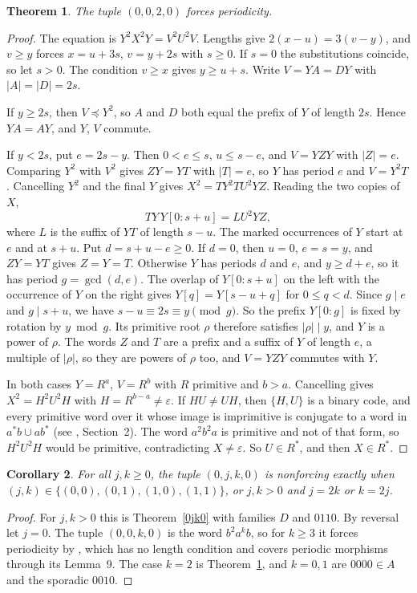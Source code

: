 \documentclass[10pt]{article}
\newtheorem{theorem}{Theorem}
\newtheorem{corollary}[theorem]{Corollary}
\newcommand{\eps}{\varepsilon}
\theoremstyle{remark}\newtheorem*{remark}{Remark}
\begin{document}
\begin{theorem}\label{0020}
The tuple \((0,0,2,0)\) forces periodicity.
\end{theorem}
\begin{proof}
The equation is \(Y^2X^2Y=V^2U^2V\). Lengths give \(2(x-u)=3(v-y)\), and \(v\ge y\) forces \(x=u+3s\), \(v=y+2s\) with \(s\ge0\). If \(s=0\) the substitutions coincide, so let \(s>0\). The condition \(v\ge x\) gives \(y\ge u+s\). Write \(V=YA=DY\) with \(|A|=|D|=2s\).

If \(y\ge2s\), then \(V\preceq Y^2\), so \(A\) and \(D\) both equal the prefix of \(Y\) of length \(2s\). Hence \(YA=AY\), and \(Y\), \(V\) commute.

If \(y<2s\), put \(e=2s-y\). Then \(0<e\le s\), \(u\le s-e\), and \(V=YZY\) with \(|Z|=e\). Comparing \(Y^2\) with \(V^2\) gives \(ZY=YT\) with \(|T|=e\), so \(Y\) has period \(e\) and \(V=Y^2T\). Cancelling \(Y^2\) and the final \(Y\) gives \(X^2=TY^2TU^2YZ\). Reading the two copies of \(X\),
\[TY\,Y[0:s+u]=LU^2YZ,\]
where \(L\) is the suffix of \(YT\) of length \(s-u\). The marked occurrences of \(Y\) start at \(e\) and at \(s+u\). Put \(d=s+u-e\ge0\). If \(d=0\), then \(u=0\), \(e=s=y\), and \(ZY=YT\) gives \(Z=Y=T\). Otherwise \(Y\) has periods \(d\) and \(e\), and \(y\ge d+e\), so it has period \(g=\gcd(d,e)\). The overlap of \(Y[0:s+u]\) on the left with the occurrence of \(Y\) on the right gives \(Y[q]=Y[s-u+q]\) for \(0\le q<d\). Since \(g\mid e\) and \(g\mid s+u\), we have \(s-u\equiv 2s\equiv y\pmod g\). So the prefix \(Y[0:g]\) is fixed by rotation by \(y\bmod g\). Its primitive root \(\rho\) therefore satisfies \(|\rho|\mid y\), and \(Y\) is a power of \(\rho\). The words \(Z\) and \(T\) are a prefix and a suffix of \(Y\) of length \(e\), a multiple of \(|\rho|\), so they are powers of \(\rho\) too, and \(V=YZY\) commutes with \(Y\).

In both cases \(Y=R^a\), \(V=R^b\) with \(R\) primitive and \(b>a\). Cancelling gives \(X^2=H^2U^2H\) with \(H=R^{b-a}\ne\eps\). If \(HU\ne UH\), then \(\{H,U\}\) is a binary code, and every primitive word over it whose image is imprimitive is conjugate to a word in \(a^*b\cup ab^*\) (see \cite{hh}, Section~2). The word \(a^2b^2a\) is primitive and not of that form, so \(H^2U^2H\) would be primitive, contradicting \(X\ne\eps\). So \(U\in R^*\), and then \(X\in R^*\).
\end{proof}

\begin{corollary}\label{0jk0full}
For all \(j,k\ge0\), the tuple \((0,j,k,0)\) is nonforcing exactly when \((j,k)\in\{(0,0),(0,1),(1,0),(1,1)\}\), or \(j,k>0\) and \(j=2k\) or \(k=2j\).
\end{corollary}
\begin{proof}
For \(j,k>0\) this is Theorem~\ref{0jk0} with families \(D\) and \(0110\). By reversal let \(j=0\). The tuple \((0,0,k,0)\) is the word \(b^2a^kb\), so for \(k\ge3\) it forces periodicity by \cite[Theorem~1]{hh}, which has no length condition and covers periodic morphisms through its Lemma~9. The case \(k=2\) is Theorem~\ref{0020}, and \(k=0,1\) are \(0000\in A\) and the sporadic \(0010\).
\end{proof}
\end{document}

